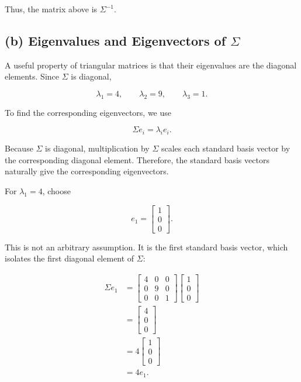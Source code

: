 \documentclass[12pt]{article}
\begin{document}
	Thus, the matrix above is $\Sigma^{-1}$.
	
	\subsection*{(b) Eigenvalues and Eigenvectors of $\Sigma$}
	
	A useful property of triangular matrices is that their eigenvalues
	are the diagonal elements. Since $\Sigma$ is diagonal,
	
	\[
	\boxed{
		\lambda_1=4,\qquad
		\lambda_2=9,\qquad
		\lambda_3=1
	}.
	\]
	
	To find the corresponding eigenvectors, we use
	
	\[
	\Sigma e_i=\lambda_i e_i.
	\]
	
	Because $\Sigma$ is diagonal, multiplication by $\Sigma$ scales
	each standard basis vector by the corresponding diagonal element.
	Therefore, the standard basis vectors naturally give the
	corresponding eigenvectors.
	
	For $\lambda_1=4$, choose
	
	\[
	e_1=
	\begin{bmatrix}
		1\\0\\0
	\end{bmatrix}.
	\]
	
	This is not an arbitrary assumption. It is the first standard basis
	vector, which isolates the first diagonal element of $\Sigma$:
	
	\[
	\begin{aligned}
		\Sigma e_1
		&=
		\begin{bmatrix}
			4&0&0\\
			0&9&0\\
			0&0&1
		\end{bmatrix}
		\begin{bmatrix}
			1\\0\\0
		\end{bmatrix}\\
		&=
		\begin{bmatrix}
			4\\0\\0
		\end{bmatrix}\\
		&=
		4
		\begin{bmatrix}
			1\\0\\0
		\end{bmatrix}\\
		&=4e_1.
	\end{aligned}
	\]
	
\end{document}
